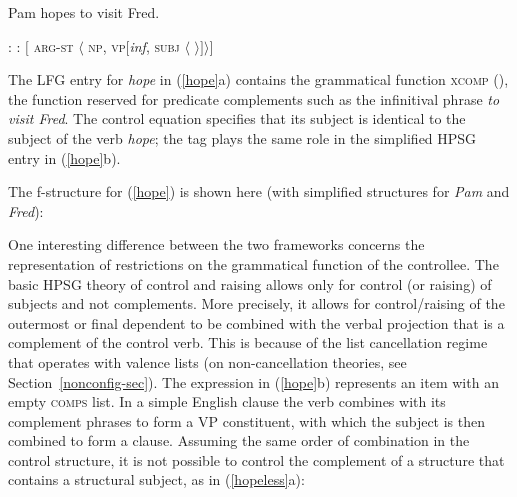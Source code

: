 \begin{exe} 
\ex	\label{hope}
Pam hopes to visit Fred.
\begin{xlist} 
\ex	
{}: \qquad {}
\ex 
{}:  \qquad  $[$ \textsc{arg-st} $\langle$ \textsc{np}, \textsc{vp}[\textit{inf}, \textsc{subj} $\langle$  $ \rangle ] \rangle ]$
\end{xlist}
\end{exe}
The LFG entry for \textit{hope} in (\ref{hope}a) contains the grammatical function \textsc{xcomp} (), the function reserved for predicate complements such as the infinitival phrase \textit{to visit Fred}.  The control equation specifies that its subject is identical to the subject of the verb \textit{hope}; the  tag  plays the same role in the simplified HPSG entry in (\ref{hope}b).  

The f-structure for (\ref{hope}) is shown here (with simplified structures for \textit{Pam} and \textit{Fred}):

\begin{exe}
\ex \label{hopefs} 
{
}
\end{exe}

\noindent
One interesting difference between the two frameworks concerns the representation of restrictions on the grammatical function of the controllee.   The basic HPSG theory of control and raising \citep[for example, the one presented in][132-145]{ps2} allows only for control (or raising) of subjects and not complements.  More precisely, it allows for control/raising of the outermost or final dependent to be combined with the verbal projection that is a complement of the control verb.  This is because of the list cancellation regime that operates with valence lists (on non-cancellation theories, see Section~\ref{nonconfig-sec}).  The expression  in  (\ref{hope}b) represents an item with an empty \textsc{comps} list.  In a simple English clause the verb combines with its complement phrases to form a VP constituent, with which the subject is then combined to form a clause.  Assuming the same order of combination in the control structure, it is not possible to control the complement of a structure that contains a structural subject, as in (\ref{hopeless}a):

